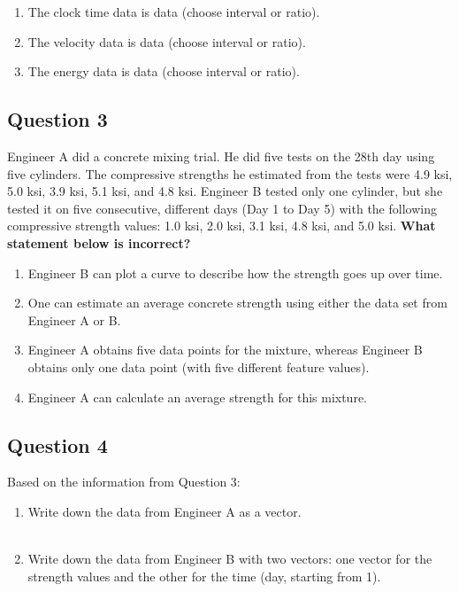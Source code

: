 \documentclass[12pt]{article}
\begin{document}
\begin{enumerate}
    \item The clock time data is \underline{\hspace{4cm}} data (choose interval or ratio).
    \item The velocity data is \underline{\hspace{4cm}} data (choose interval or ratio).
    \item The energy data is \underline{\hspace{4cm}} data (choose interval or ratio).
\end{enumerate}

\subsection*{Question 3}
Engineer A did a concrete mixing trial. He did five tests on the 28th day using five cylinders. The compressive strengths he estimated from the tests were 4.9 ksi, 5.0 ksi, 3.9 ksi, 5.1 ksi, and 4.8 ksi. Engineer B tested only one cylinder, but she tested it on five consecutive, different days (Day 1 to Day 5) with the following compressive strength values: 1.0 ksi, 2.0 ksi, 3.1 ksi, 4.8 ksi, and 5.0 ksi. \textbf{What statement below is incorrect?}

\begin{enumerate}
    \item Engineer B can plot a curve to describe how the strength goes up over time.
    \item One can estimate an average concrete strength using either the data set from Engineer A or B.
    \item Engineer A obtains five data points for the mixture, whereas Engineer B obtains only one data point (with five different feature values).
    \item Engineer A can calculate an average strength for this mixture.
\end{enumerate}

\subsection*{Question 4}
Based on the information from Question 3:

\begin{enumerate}
    \item Write down the data from Engineer A as a vector.\\
    
    \vspace{20pt}
    \fullunderline \\
    \item Write down the data from Engineer B with two vectors: one vector for the strength values and the other for the time (day, starting from 1).\\ \\
    \vspace{20pt}
    
    \fullunderline \\

    \vspace{30pt}


     \fullunderline 
\end{enumerate}
\end{document}
